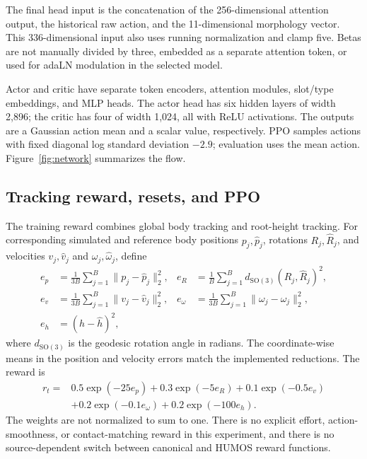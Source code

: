 \documentclass[11pt]{article}
\newcommand{\SO}{\mathrm{SO}}
\begin{document}
The final head input is the concatenation of the 256-dimensional attention
output, the historical raw action, and the 11-dimensional morphology vector.
This 336-dimensional input also uses running normalization and clamp five.
Betas are not manually divided by three, embedded as a separate attention
token, or used for adaLN modulation in the selected model.

Actor and critic have separate token encoders, attention modules, slot/type
embeddings, and MLP heads. The actor head has six hidden layers of width
2,896; the critic has four of width 1,024, all with ReLU activations.
The outputs are a Gaussian action mean and a scalar value, respectively.
PPO samples actions with fixed diagonal log standard deviation $-2.9$;
evaluation uses the mean action. Figure~\ref{fig:network} summarizes the flow.

\subsection{Tracking reward, resets, and PPO}\label{sec:learning}

The training reward combines global body tracking and root-height tracking.
For corresponding simulated and reference body positions $p_j,\hat{p}_j$,
rotations $R_j,\hat{R}_j$, and velocities $v_j,\hat{v}_j$ and
$\omega_j,\hat{\omega}_j$, define
\begin{align}
    e_p &= \frac{1}{3B}\sum_{j=1}^{B}\|p_j-\hat{p}_j\|_2^2,
    & e_R &= \frac{1}{B}\sum_{j=1}^{B}
                  d_{\SO(3)}(R_j,\hat{R}_j)^2, \\
    e_v &= \frac{1}{3B}\sum_{j=1}^{B}\|v_j-\hat{v}_j\|_2^2,
    & e_\omega &= \frac{1}{3B}\sum_{j=1}^{B}
                     \|\omega_j-\hat{\omega}_j\|_2^2, \\
    e_h &= (h-\hat{h})^2, &&
\end{align}
where $d_{\SO(3)}$ is the geodesic rotation angle in radians.
The coordinate-wise means in the position and velocity errors match the
implemented reductions. The reward is
\begin{equation}
\begin{split}
    r_t ={}& 0.5\exp(-25e_p) + 0.3\exp(-5e_R)
             + 0.1\exp(-0.5e_v)\\
           &+0.2\exp(-0.1e_\omega) + 0.2\exp(-100e_h).
\end{split}\label{eq:reward}
\end{equation}
The weights are not normalized to sum to one. There is no explicit effort,
action-smoothness, or contact-matching reward in this experiment, and there
is no source-dependent switch between canonical and HUMOS reward functions.
\end{document}
